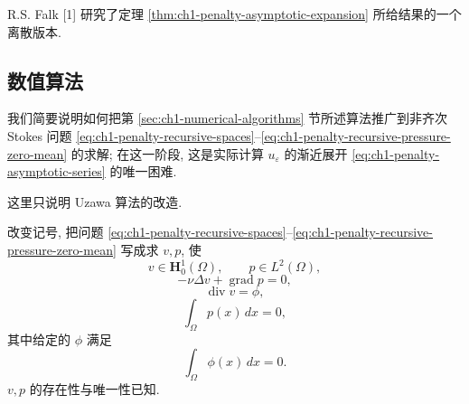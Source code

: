 \begin{Remark}
\label{rem:ch1-penalty-discrete-asymptotic-version}
R.S. Falk [1] 研究了定理 \ref{thm:ch1-penalty-asymptotic-expansion} 所给结果的一个离散版本.
\end{Remark}

\subsection{数值算法}
\label{subsec:ch1-penalty-numerical-algorithms}

我们简要说明如何把第 \ref{sec:ch1-numerical-algorithms} 节所述算法推广到非齐次 Stokes 问题 \eqref{eq:ch1-penalty-recursive-spaces}--\eqref{eq:ch1-penalty-recursive-pressure-zero-mean} 的求解; 在这一阶段, 这是实际计算 $u_\varepsilon$ 的渐近展开 \eqref{eq:ch1-penalty-asymptotic-series} 的唯一困难.

这里只说明 Uzawa 算法的改造.

改变记号, 把问题 \eqref{eq:ch1-penalty-recursive-spaces}--\eqref{eq:ch1-penalty-recursive-pressure-zero-mean} 写成求 $v,p$, 使
\begin{equation}
v\in\mathbf H_0^1(\Omega),
\qquad p\in L^2(\Omega),
\label{eq:ch1-penalty-algorithm-spaces}
\end{equation}
\begin{equation}
-\nu\Delta v+\operatorname{grad}p=0,
\label{eq:ch1-penalty-algorithm-momentum}
\end{equation}
\begin{equation}
\operatorname{div}v=\phi,
\label{eq:ch1-penalty-algorithm-divergence}
\end{equation}
\begin{equation}
\int_\Omega p(x)\,dx=0,
\label{eq:ch1-penalty-algorithm-pressure-zero-mean}
\end{equation}
其中给定的 $\phi$ 满足
\begin{equation}
\int_\Omega\phi(x)\,dx=0.
\label{eq:ch1-penalty-algorithm-data-compatibility}
\end{equation}
$v,p$ 的存在性与唯一性已知.

